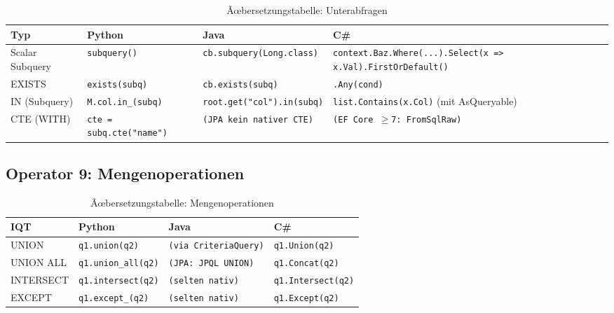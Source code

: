 \begin{table}
\centering
\caption{Ãœbersetzungstabelle: Unterabfragen}
\label{tab:subquery_ops}
\renewcommand{\arraystretch}{1.4}
\begin{tabularx}{\textwidth}{lXXX}
\toprule
\textbf{Typ} & \textbf{Python} & \textbf{Java} & \textbf{C\#} \\
\midrule
Scalar Subquery
  & \texttt{subquery()}
  & \texttt{cb.subquery(Long.class)}
  & \texttt{context.Baz.Where(...).Select(x => x.Val).FirstOrDefault()} \\
EXISTS
  & \texttt{exists(subq)}
  & \texttt{cb.exists(subq)}
  & \texttt{.Any(cond)} \\
IN (Subquery)
  & \texttt{M.col.in\_(subq)}
  & \texttt{root.get("col").in(subq)}
  & \texttt{list.Contains(x.Col)} (mit AsQueryable) \\
CTE (WITH)
  & \texttt{cte = subq.cte("name")}
  & \texttt{(JPA kein nativer CTE)}
  & \texttt{(EF Core $\geq$7: FromSqlRaw)} \\
\bottomrule
\end{tabularx}
\end{table}

\subsection{Operator 9: Mengenoperationen}
\label{subsec:op_set}

\begin{table}[H]
\centering
\caption{Ãœbersetzungstabelle: Mengenoperationen}
\label{tab:set_ops}
\renewcommand{\arraystretch}{1.4}
\begin{tabularx}{\textwidth}{lXXX}
\toprule
\textbf{IQT} & \textbf{Python} & \textbf{Java} & \textbf{C\#} \\
\midrule
UNION
  & \texttt{q1.union(q2)}
  & \texttt{(via CriteriaQuery)} 
  & \texttt{q1.Union(q2)} \\
UNION ALL
  & \texttt{q1.union\_all(q2)}
  & \texttt{(JPA: JPQL UNION)} 
  & \texttt{q1.Concat(q2)} \\
INTERSECT
  & \texttt{q1.intersect(q2)}
  & \texttt{(selten nativ)}
  & \texttt{q1.Intersect(q2)} \\
EXCEPT
  & \texttt{q1.except\_(q2)}
  & \texttt{(selten nativ)}
  & \texttt{q1.Except(q2)} \\
\bottomrule
\end{tabularx}
\end{table}

